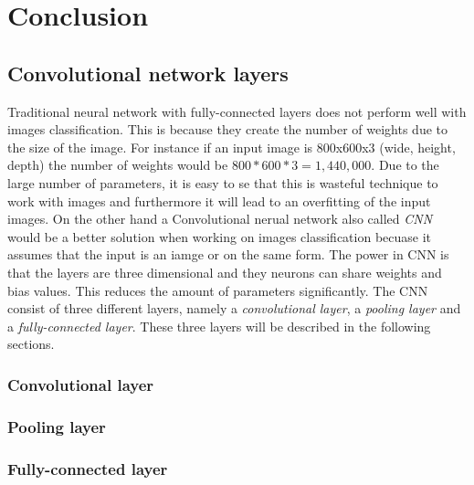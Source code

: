\chapter{Conclusion}
\label{chp:conc}

\section{Convolutional network layers}

Traditional neural network with fully-connected layers does not perform well with images classification. This is because they create the number of weights due to the size of the image. For instance if an input image is 800x600x3 (wide, height, depth) the number of weights would be $800 * 600 * 3 = 1,440,000$. Due to the large number of parameters, it is easy to se that this is wasteful technique to work with images and furthermore it will lead to an overfitting of the input images. On the other hand a
Convolutional nerual network also called \emph{CNN} would be a better solution when working on images classification becuase it assumes that the input is an iamge or on the same form. The power in CNN is that the layers are three dimensional and they neurons can share weights and bias values. This reduces the amount of parameters significantly. The CNN consist of three different layers, namely a \emph{convolutional layer}, a \emph{pooling layer} and a \emph{fully-connected layer}. These three layers will be described in the following sections.
 
\subsection{Convolutional layer}

\subsection{Pooling layer}

\subsection{Fully-connected layer}